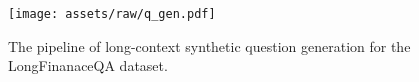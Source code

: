 \begin{figure}
    \centering
    \texttt{[image: assets/raw/q\_gen.pdf]}
    \caption{The pipeline of long-context synthetic question generation for the LongFinanaceQA dataset.}
    \label{fig:query_gen}
\end{figure}